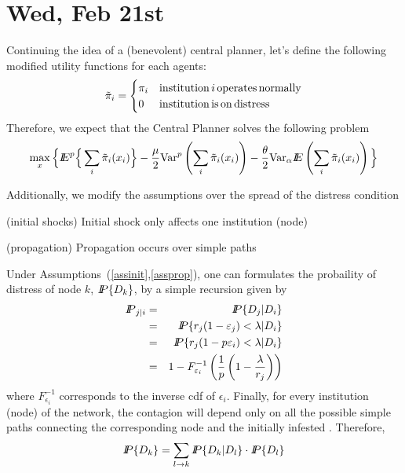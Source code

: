 \section{Wed, Feb 21st}
Continuing the idea of a (benevolent) central planner, let's define the following modified utility functions for each agents:
\[\tilde{\pi}_i=\begin{cases} \pi_i&{\rm institution}\,i\,{\rm operates\,normally}\\
0&{\rm institution\,is\,on\,distress}\end{cases}\]
Therefore, we expect that the Central Planner solves the following problem
\[\max_x\Big\lbrace {I\kern-.35em E}^p\Big\lbrace\sum_i \tilde\pi_i(x_i)\Big\rbrace -\frac{\mu}{2}{\rm Var}^p\left(\sum_i \tilde\pi_i(x_i)\right)-\frac{\theta}{2}{\rm Var}_\alpha{I\kern-.35em E}\left(\sum_i \tilde\pi_i(x_i)\right)\Big\rbrace\]

Additionally, we modify the assumptions over the spread of the distress condition

\begin{assumption}{\rm (initial shocks)}\label{assinit}
Initial shock only affects one institution (node)
\end{assumption} 

\begin{assumption}{\rm (propagation)}\label{assprop}
Propagation occurs over simple paths
\end{assumption} 

Under Assumptions~(\ref{assinit},\ref{assprop}), one can formulates the probaility of distress of node $k$, ${I\kern-.35em P}\{D_k\}$, by a simple recursion given by
\begin{eqnarray*}
{I\kern-.35em P}_{j|i}&=&{I\kern-.35em P}\{D_j|D_i\}\\
&=&{I\kern-.35em P}\{r_j(1-\varepsilon_j)<\lambda|D_i\}\\
&=&{I\kern-.35em P}\{r_j(1-p\varepsilon_i)<\lambda|D_i\}\\
&=&1-F_{\varepsilon_i}^{-1}\left(\frac{1}{p}\left(1-\frac{\lambda}{r_j}\right)\right)
\end{eqnarray*}
where $F_{\epsilon_i}^{-1}$ corresponds to the inverse cdf of $\epsilon_i$.  Finally, for every institution (node) of the network, the contagion will depend only on all the possible simple paths connecting the corresponding node and the initially infested . Therefore,
\begin{equation}
{I\kern-.35em P}\{D_k\}=\sum_{l\to k} {I\kern-.35em P}\{D_k|D_l\}\cdot{I\kern-.35em P}\{D_l\}
\end{equation}